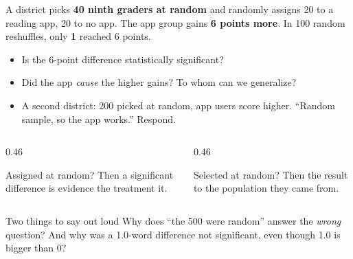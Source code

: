 \documentclass[aspectratio=169, 11pt]{beamer}
\begin{document}
\begin{frame}[t, plain]
  A district picks \textbf{40 ninth graders at random} and randomly assigns 20 to a reading app,
  20 to no app. The app group gains \textbf{6 points more}. In 100 random reshuffles, only
  \textbf{1} reached 6 points.
  \begin{itemize}\setlength{\itemsep}{4pt}
    \item Is the 6-point difference statistically significant?
    \item Did the app \emph{cause} the higher gains? To whom can we generalize?
    \item A second district: 200 picked at random, app users score higher. ``Random sample,
          so the app works.'' Respond.
  \end{itemize}
\end{frame}

\begin{frame}[t, plain]
  \vspace{6pt}
  \begin{columns}[t]
    \begin{column}{0.46\textwidth}
      \begin{block}{Assigned at random?}
        Then a significant difference is evidence the treatment  it.
      \end{block}
    \end{column}
    \begin{column}{0.46\textwidth}
      \begin{block}{Selected at random?}
        Then the result  to the population they came from.
      \end{block}
    \end{column}
  \end{columns}
  \vspace{12pt}
  \begin{block}{Two things to say out loud}
    Why does ``the 500 were random'' answer the \emph{wrong} question? And why was a 1.0-word
    difference not significant, even though 1.0 is bigger than 0?
  \end{block}
\end{frame}
\end{document}
